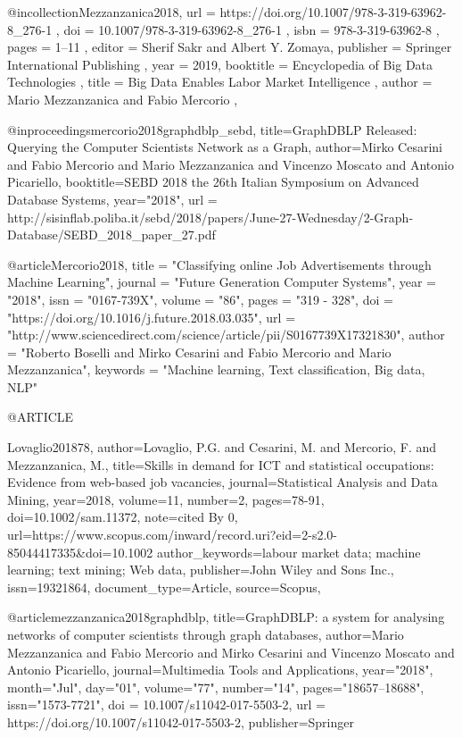 {@incollection{Mezzanzanica2018,
  url = { https://doi.org/10.1007/978-3-319-63962-8_276-1 },
  doi = { 10.1007/978-3-319-63962-8_276-1 },
  isbn = { 978-3-319-63962-8 },
  pages = { 1--11 },
editor    = {Sherif Sakr and Albert Y. Zomaya},
  publisher = { Springer International Publishing },
  year = {2019},
  booktitle = { Encyclopedia of Big Data Technologies },
  title = { Big Data Enables Labor Market Intelligence },
  author = { Mario Mezzanzanica and Fabio Mercorio },
}

@inproceedings{mercorio2018graphdblp_sebd,
  title={GraphDBLP Released: Querying the Computer
Scientists Network as a Graph},
  author={Mirko Cesarini and Fabio Mercorio and Mario Mezzanzanica and Vincenzo Moscato and Antonio Picariello},
  booktitle={SEBD 2018 the 26th Italian Symposium on Advanced Database Systems},
year="2018",
  url = {http://sisinflab.poliba.it/sebd/2018/papers/June-27-Wednesday/2-Graph-Database/SEBD_2018_paper_27.pdf}
}


@article{Mercorio2018,
title = "Classifying online Job Advertisements through Machine Learning",
journal = "Future Generation Computer Systems",
year = "2018",
issn = "0167-739X",
volume = "86",
pages = "319 - 328",
doi = "https://doi.org/10.1016/j.future.2018.03.035",
url = "http://www.sciencedirect.com/science/article/pii/S0167739X17321830",
author = "Roberto Boselli and Mirko Cesarini and Fabio Mercorio and Mario Mezzanzanica",
keywords = "Machine learning, Text classification, Big data, NLP"
}

@ARTICLE{Lovaglio201878,
author={Lovaglio, P.G. and Cesarini, M. and Mercorio, F. and Mezzanzanica, M.},
title={Skills in demand for ICT and statistical occupations: Evidence from web-based job vacancies},
journal={Statistical Analysis and Data Mining},
year={2018},
volume={11},
number={2},
pages={78-91},
doi={10.1002/sam.11372},
note={cited By 0},
url={https://www.scopus.com/inward/record.uri?eid=2-s2.0-85044417335&doi=10.1002%
author_keywords={labour market data;  machine learning;  text mining;  Web data},
publisher={John Wiley and Sons Inc.},
issn={19321864},
document_type={Article},
source={Scopus},
}


@article{mezzanzanica2018graphdblp,
  title={GraphDBLP: a system for analysing networks of computer scientists through graph databases},
  author={Mario Mezzanzanica and Fabio Mercorio and Mirko Cesarini and Vincenzo Moscato and Antonio Picariello},
  journal={Multimedia Tools and Applications},
year="2018",
month="Jul",
day="01",
volume="77",
number="14",
pages="18657--18688",
issn="1573-7721",
  doi = {10.1007/s11042-017-5503-2},
  url = {https://doi.org/10.1007/s11042-017-5503-2},
  publisher={Springer}
}

}}
